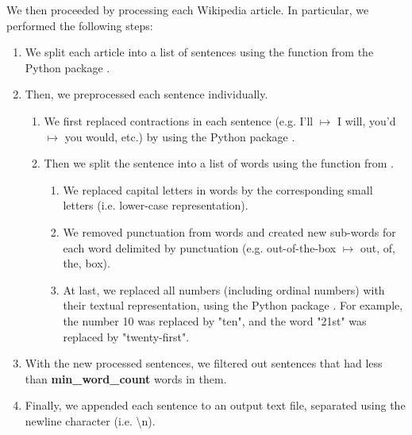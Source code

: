 We then proceeded by processing each Wikipedia article. In particular, we performed the following steps:
\begin{enumerate}
    \item We split each article into a list of sentences using the  function from the  Python package \cite{bird2009natural}.
    \item Then, we preprocessed each sentence individually.
    \begin{enumerate}
        \item We first replaced contractions in each sentence (e.g. I'll $\mapsto$ I will, you'd $\mapsto$ you would, etc.) by using the  Python package \cite{contractions-2016}.
        \item Then we split the sentence into a list of words using the  function from .
        \begin{enumerate}
            \item We replaced capital letters in words by the corresponding small letters (i.e. lower-case representation).
            \item We removed punctuation from words and created new sub-words for each word delimited by punctuation (e.g. out-of-the-box $\mapsto$ out, of, the, box).
            \item At last, we replaced all numbers (including ordinal numbers) with their textual representation, using the  Python package \cite{num2words2014}. For example, the number 10 was replaced by "ten", and the word "21st" was replaced by "twenty-first".
        \end{enumerate}
    \end{enumerate}
    \item With the new processed sentences, we filtered out sentences that had less than \textbf{min\_word\_count} words in them.
    \item Finally, we appended each sentence to an output text file, separated using the newline character (i.e. \textbackslash n).
\end{enumerate}

